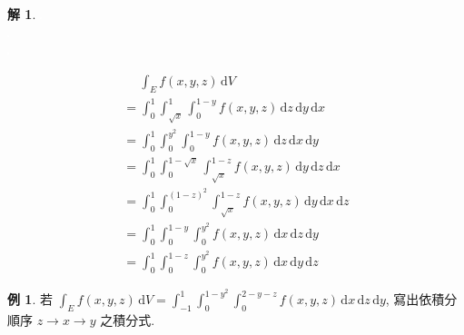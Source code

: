\documentclass[12pt]{extarticle}
\newcommand{\ds}{\displaystyle}
\theoremstyle{definition}
\newtheorem*{ex}{例}
\newtheorem*{sol}{解}
\begin{document}
{\begin{sol}
  \begin{minipage}{0.45\textwidth}
    \includegraphics[scale=0.7,page=12]{fig/prob.pdf} \\
    \includegraphics[scale=0.7,page=11]{fig/prob.pdf} \\ 
    \includegraphics[scale=0.6,page=10]{fig/prob.pdf} 
  \end{minipage}
  \quad
  \begin{minipage}{0.55\textwidth}
    \begin{align*}
      &\;\quad\int_E f(x, y, z)\,\text{d}V & \\
      &= \int_0^1\!\int_{\sqrt{x}}^{1}\int_0^{1 - y}\!\!f(x, y, z)\,\text{d}z\,\text{d}y\,\text{d}x \\
      &= \int_0^1\!\int_{0}^{y^2}\!\!\!\int_0^{1 - y}\!\!f(x, y, z)\,\text{d}z\,\text{d}x\,\text{d}y \\
      &= \int_0^1\!\int_{0}^{1 - \sqrt{x}}\!\!\int_{\sqrt{x}}^{1 - z}\!\!f(x, y, z)\,\text{d}y\,\text{d}z\,\text{d}x \\
      &= \int_0^1\!\int_{0}^{(1 - z)^2}\!\!\!\int_{\sqrt{x}}^{1 - z}\!\!f(x, y, z)\,\text{d}y\,\text{d}x\,\text{d}z \\
      &= \int_0^1\!\int_{0}^{1 - y}\!\!\!\int_{0}^{y^2}\!\!f(x, y, z)\,\text{d}x\,\text{d}z\,\text{d}y \\
      &= \int_0^1\!\int_{0}^{1 - z}\!\!\!\int_0^{y^2}\!\!f(x, y, z)\,\text{d}x\,\text{d}y\,\text{d}z 
    \end{align*}
  \end{minipage}
\end{sol}

\begin{ex}
  若 $\ds\int_E f(x, y, z)\,\text{d}V = \int_{-1}^1\!\int_0^{1 - y^2}\!\!\int_0^{2 - y - z}\!\!f(x, y, z)\,\text{d}x\,\text{d}z\,\text{d}y$, 寫出依積分順序 $z\to x\to y$ 之積分式.
\end{ex}

}
\end{document}
